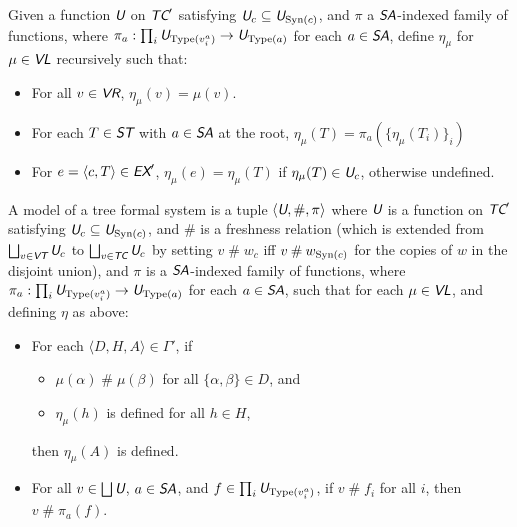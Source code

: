 \documentclass[runningheads,a4paper]{llncs}
\newcommand{\vr}{\textit{\textsf{VR}}} %
\newcommand{\ex}{\textit{\textsf{EX}}} %
\newcommand{\tc}{\textit{\textsf{TC}}} %
\newcommand{\vt}{\textit{\textsf{VT}}} %
\newcommand{\vl}{\textit{\textsf{VL}}} %
\newcommand{\uv}{\textit{\textsf{U}}} %
\newcommand{\sa}{\textit{\textsf{SA}}} %
\newcommand{\st}{\textit{\textsf{ST}}} %
\newcommand{\ang}[1]{\langle#1\rangle}
\newcommand{\type}{{\rm Type}}
\newcommand{\syn}{{\rm Syn}}
\newcommand{\fresh}{\mathbin{\#}}
\begin{document}
\begin{definition}
Given a function $\uv$ on $\tc'$ satisfying $\uv_c\subseteq\uv_{\syn(c)}$, and $\pi$ a $\sa$-indexed family of functions, where $\pi_a:\prod_i\uv_{\type(v^a_i)}\to\uv_{\type(a)}$ for each $a\in\sa$, define $\eta_\mu$ for $\mu\in\vl$ recursively such that:
\begin{itemize}
  \item For all $v\in\vr$, $\eta_\mu(v)=\mu(v)$.
  \item For each $T\in\st$ with $a\in\sa$ at the root, $\eta_\mu(T)=\pi_a(\{\eta_\mu(T_i)\}_i)$
  \item For $e=\ang{c,T}\in\ex'$, $\eta_\mu(e)=\eta_\mu(T)$ if $\eta_\mu(T)\in\uv_c$, otherwise undefined.
\end{itemize}
\end{definition}

\begin{definition}
A model of a tree formal system is a tuple $\ang{\uv,\fresh,\pi}$ where $\uv$ is a function on $\tc'$ satisfying $\uv_c\subseteq\uv_{\syn(c)}$, and $\fresh$ is a freshness relation (which is extended from $\bigsqcup_{v\in\vt}\uv_c$ to $\bigsqcup_{v\in\tc}\uv_c$ by setting $v\fresh w_c$ iff $v\fresh w_{\syn(c)}$ for the copies of $w$ in the disjoint union), and $\pi$ is a $\sa$-indexed family of functions, where $\pi_a:\prod_i\uv_{\type(v^a_i)}\to\uv_{\type(a)}$ for each $a\in\sa$, such that for each $\mu\in\vl$, and defining $\eta$ as above:

\begin{itemize}
  \item For each $\ang{D,H,A}\in\Gamma'$, if
  \begin{itemize}
    \item $\mu(\alpha)\fresh\mu(\beta)$ for all $\{\alpha,\beta\}\in D$, and
    \item $\eta_\mu(h)$ is defined for all $h\in H$,
  \end{itemize}
  then $\eta_\mu(A)$ is defined.
  \item For all $v\in\bigsqcup\uv$, $a\in\sa$, and $f\in\prod_i\uv_{\type(v^a_i)}$, if $v\fresh f_i$ for all $i$, then $v\fresh\pi_a(f)$.
\end{itemize}
\end{definition}
\end{document}
